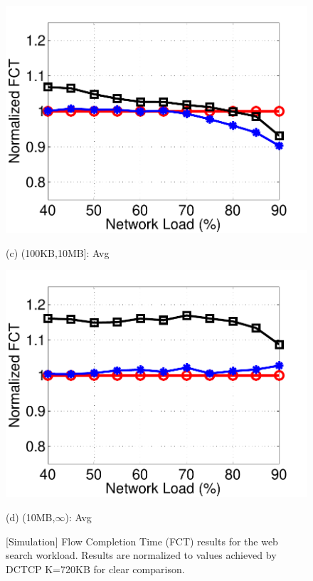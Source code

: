 \begin{figure}[t]
\begin{minipage}{0.245\linewidth}
   \includegraphics[width=1\linewidth]{figs/websearch_medium_avg_fct.pdf}
   \centerline{(c) (100KB,10MB]: Avg}
\end{minipage}
\begin{minipage}{0.245\linewidth}
   \includegraphics[width=1\linewidth]{figs/websearch_large_avg_fct.pdf}
   \centerline{(d) (10MB,$\infty$): Avg}
\end{minipage}
  \vspace{-2mm}
\caption{[Simulation] Flow Completion Time (FCT) results for the web search workload. Results are normalized to values achieved by DCTCP K=720KB for clear comparison.}\label{fig:websearch_fct}
  \vspace{-3mm}
\end{figure}
